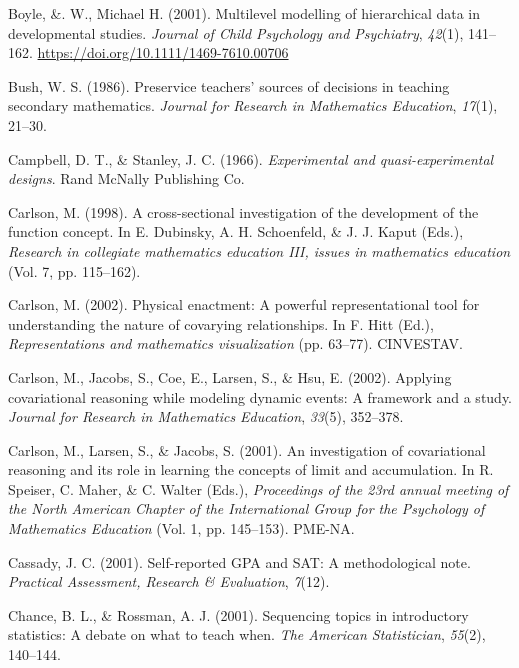 \documentclass[11pt]{umnthesis}
\newlength{\cslhangindent}
\newenvironment{CSLReferences}[2] %
 {%
  \setlength{\parindent}{0pt}
  \ifodd #1 \everypar{\setlength{\hangindent}{\cslhangindent}}\ignorespaces\fi
  \ifnum #2 > 0
  \setlength{\parskip}{#2\baselineskip}
  \fi
 }%
 {}
\begin{document}
\begin{CSLReferences}{1}{0}
\leavevmode{}%
Boyle, \&. W., Michael H. (2001). Multilevel modelling of hierarchical data in developmental studies. \emph{Journal of Child Psychology and Psychiatry}, \emph{42}(1), 141--162. \url{https://doi.org/10.1111/1469-7610.00706}

\leavevmode{}%
Bush, W. S. (1986). Preservice teachers' sources of decisions in teaching secondary mathematics. \emph{Journal for Research in Mathematics Education}, \emph{17}(1), 21--30.

\leavevmode{}%
Campbell, D. T., \& Stanley, J. C. (1966). \emph{Experimental and quasi-experimental designs}. Rand McNally Publishing Co.

\leavevmode{}%
Carlson, M. (1998). A cross-sectional investigation of the development of the function concept. In E. Dubinsky, A. H. Schoenfeld, \& J. J. Kaput (Eds.), \emph{Research in collegiate mathematics education III, issues in mathematics education} (Vol. 7, pp. 115--162).

\leavevmode{}%
Carlson, M. (2002). Physical enactment: A powerful representational tool for understanding the nature of covarying relationships. In F. Hitt (Ed.), \emph{Representations and mathematics visualization} (pp. 63--77). CINVESTAV.

\leavevmode{}%
Carlson, M., Jacobs, S., Coe, E., Larsen, S., \& Hsu, E. (2002). Applying covariational reasoning while modeling dynamic events: A framework and a study. \emph{Journal for Research in Mathematics Education}, \emph{33}(5), 352--378.

\leavevmode{}%
Carlson, M., Larsen, S., \& Jacobs, S. (2001). An investigation of covariational reasoning and its role in learning the concepts of limit and accumulation. In R. Speiser, C. Maher, \& C. Walter (Eds.), \emph{Proceedings of the 23rd annual meeting of the {North American Chapter of the International Group for the Psychology of Mathematics Education}} (Vol. 1, pp. 145--153). PME-NA.

\leavevmode{}%
Cassady, J. C. (2001). Self-reported {GPA} and {SAT}: A methodological note. \emph{Practical Assessment, Research \& Evaluation}, \emph{7}(12).

\leavevmode{}%
Chance, B. L., \& Rossman, A. J. (2001). Sequencing topics in introductory statistics: A debate on what to teach when. \emph{The American Statistician}, \emph{55}(2), 140--144.


\end{CSLReferences}
\end{document}
